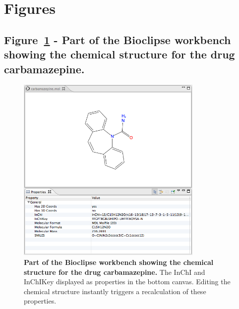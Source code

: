 \documentclass[10pt]{bmc_article}
\newenvironment{bmcformat}{\fussy\setboolean{publ}{true}}{\fussy}
\begin{document}
\begin{bmcformat}


\newpage

\section*{Figures}
  \subsection*{Figure~\ref{fig:carba-prop} - Part of the Bioclipse workbench showing the chemical structure for the drug carbamazepine.}
      

\begin{figure}[!hb]
\begin{center}
	\includegraphics[width=9cm]{carbamazepine-props.png}
\caption{\textbf{Part of the Bioclipse workbench showing the chemical structure for the drug carbamazepine.} The InChI and InChIKey displayed as properties in the bottom canvas. Editing the chemical structure instantly triggers a recalculation of these properties.}\label{fig:carba-prop}
\end{center}
\end{figure}

\newpage


\end{bmcformat}
\end{document}
